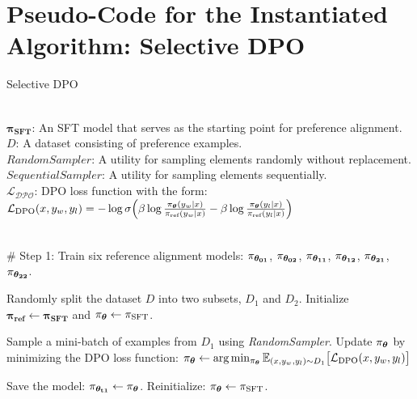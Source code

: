 \clearpage
\appendix
\onecolumn

\section{Pseudo-Code for the Instantiated Algorithm: Selective DPO}
\label{app:selective-dpo-code}
\begin{algorithm}[!h]
\caption{Selective DPO}
\label{algo:selective_dpo}
    \begin{algorithmic}
     \\
    $\boldsymbol{\pi_\text{SFT}}$: An SFT model that serves as the starting point for preference alignment. \\
    $D$: A dataset consisting of preference examples. \\ 
    $\textit{RandomSampler}$: A utility for sampling elements randomly without replacement. \\ 
    $\textit{SequentialSampler}$: A utility for sampling elements sequentially. \\ 
    $\mathcal{L_{\text{DPO}}}$: DPO loss function with the form: $\mathcal{L_{\text{DPO}}}(x,y_w,y_l) = - \log \sigma \Big(\beta \log \frac{\pi_{\bm{\theta}} (y_w | x)}{\pi_{\text{ref}}(y_w | x)} - \beta \log \frac{\pi_{\bm{\theta}}(y_l | x)}{\pi_{\text{ref}}(y_l | x)} \Big)$
    
    \ \\ 
    \# Step 1: Train six reference alignment models: 
    $\mathbf{\pi_{\bm{\theta}_{01}}}$, $\mathbf{\pi_{\bm{\theta}_{02}}}$,  $\mathbf{\pi_{\bm{\theta}_{11}}}$, $\mathbf{\pi_{\bm{\theta}_{12}}}$,  $\mathbf{\pi_{\bm{\theta}_{21}}}$, $\mathbf{\pi_{\bm{\theta}_{22}}}$. 
    
        \STATE Randomly split the dataset $D$ into two subsets, $D_1$ and $D_2$.
        \STATE Initialize $\mathbf{\pi_{\text{ref}}} \leftarrow  \mathbf{\pi_{\text{SFT}}}$ and $\mathbf{\pi_{\bm{\theta}}} \leftarrow  \mathbf{\pi_{\text{SFT}}}$. 
        
            \STATE Sample a mini-batch of examples from $D_1$ using \textit{RandomSampler}.
            \STATE Update $\mathbf{\pi_{\bm{\theta}}}$ by minimizing the DPO loss function:
            $\mathbf{\pi_{\bm{\theta}}} \leftarrow \arg\min_{\pi_{\bm{\theta}}} \mathbb{E}_{(x,y_w,y_l) \sim D_1} \big[\mathcal{L}_{\text{DPO}} (x,y_w,y_l)\big]$ \\ 

        \ENDWHILE
        
        \STATE Save the model: $\mathbf{\pi_{\bm{\theta}_{t1}}} \leftarrow \mathbf{\pi_{\bm{\theta}}}$.
        \STATE Reinitialize: $\mathbf{\pi_{\bm{\theta}}} \leftarrow  \mathbf{\pi_{\text{SFT}}}$. 
        

\end{algorithmic}
\end{algorithm}
